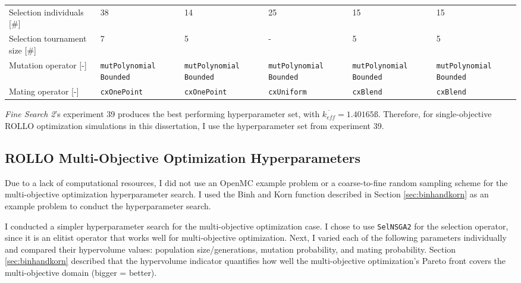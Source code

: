 \begin{table}[htbp]
{\begin{tabular}{p{3.2cm}p{2.6cm}p{2.6cm}p{2.6cm}p{2.6cm}p{2.6cm}}
    Selection individuals [\#] & 38 &14&25&15&15\\
    Selection tournament size [\#] & 7 &5&-&5&5\\
    Mutation operator [-] & \texttt{mutPolynomial} \texttt{Bounded}&\texttt{mutPolynomial} \texttt{Bounded}&\texttt{mutPolynomial} \texttt{Bounded}&\texttt{mutPolynomial} \texttt{Bounded}&\texttt{mutPolynomial} \texttt{Bounded}\\
    Mating operator [-] & \texttt{cxOnePoint} &\texttt{cxOnePoint}&\texttt{cxUniform}&\texttt{cxBlend}&\texttt{cxBlend}\\ 
    \hline
    \end{tabular}}
\end{table}
\textit{Fine Search 2}'s experiment 39 produces the best performing 
hyperparameter set, with $\overline{k_{eff}} = 1.40165ß$. 
Therefore, for single-objective ROLLO optimization simulations in this dissertation, 
I use the hyperparameter set from experiment 39. 

\subsection{ROLLO Multi-Objective Optimization Hyperparameters}
\label{sec:multi-obj-hyperparameters}
Due to a lack of computational resources, I did not use an OpenMC example problem or 
a coarse-to-fine random sampling scheme for the multi-objective optimization 
hyperparameter search.
I used the Binh and Korn function described in Section \ref{sec:binhandkorn} as 
an example problem to conduct the hyperparameter search.

I conducted a simpler hyperparameter search for the multi-objective optimization case. 
I chose to use \texttt{SelNSGA2} for the selection operator, since it is an elitist 
operator that works well for multi-objective optimization. 
Next, I varied each of the following parameters individually and compared their 
hypervolume values: population size/generations, mutation probability, and mating 
probability.
Section \ref{sec:binhandkorn} described that the hypervolume indicator quantifies 
how well the multi-objective optimization's Pareto front covers the 
multi-objective domain (bigger = better). 

